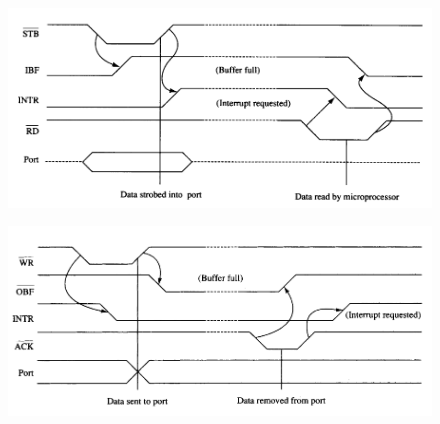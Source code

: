 \begin{figure}[h!]
  \centering
  \includegraphics[width = 1\textwidth]{./figures/Strobed_I.png}
\end{figure}
\begin{figure}[h!]
  \centering
  \includegraphics[width = 1\textwidth]{./figures/Strobed_O.png}
\end{figure}

